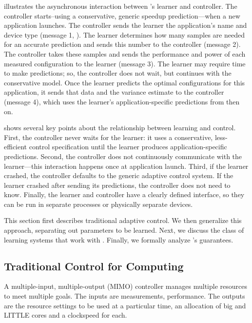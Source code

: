  illustrates the asynchronous interaction between
\SYSTEM{}'s learner and controller. The controller starts--using a
conservative, generic speedup prediction---when a new application
launches.  The controller sends the learner the application's name and
device type (message 1, ).  The learner
determines how many samples are needed for an accurate prediction and
sends this number to the controller (message 2).  The controller takes
these samples and sends the performance and power of each measured
configuration to the learner (message 3).  The learner may require
time to make predictions; so, the controller does not wait, but
continues with the conservative model.  Once the learner predicts the
optimal configurations for this application, it sends that data and
the variance estimate to the controller (message 4), which uses the
learner's application-specific predictions from then on.

 shows several key points about the relationship
between learning and control.  First, the controller never waits for
the learner: it uses a conservative, less-efficient control
specification until the learner produces application-specific
predictions.  Second, the controller does not continuously communicate
with the learner---this interaction happens once at application
launch.  Third, if the learner crashed, the controller defaults to the
generic adaptive control system.  If the learner crashed after sending
its predictions, the controller does not need to know.  Finally, the
learner and controller have a clearly defined interface, so they can
be run in separate processes or physically separate devices.

This section first describes traditional adaptive control.  We then
generalize this approach, separating out parameters to be learned.
Next, we discuss the class of learning systems that work with
\SYSTEM{}.  Finally, we formally analyze \SYSTEM{}'s guarantees.


\subsection{Traditional Control for Computing}
A multiple-input, multiple-output (MIMO) controller manages multiple
resources to meet multiple goals.  The inputs are measurements, \eg{}
performance.  The outputs are the resource settings to be used at a
particular time, \eg{} an allocation of big and LITTLE cores and a
clockspeed for each.

